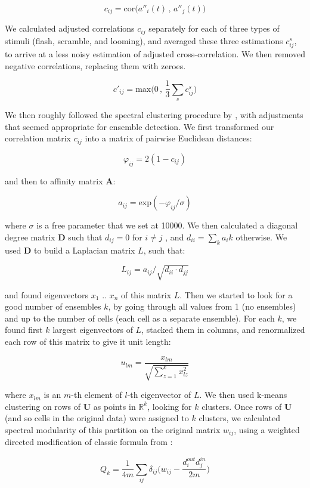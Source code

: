 \documentclass{article}
\begin{document}
\[ c_{ij} = \text{cor}\big(a''_i(t)\, , \, a''_j(t)\big) \]

We calculated adjusted correlations $c_{ij}$ separately for each of three types of stimuli (flash, scramble, and looming), and averaged these three estimations $c_{ij}^s$, to arrive at a less noisy estimation of adjusted cross-correlation. We then removed negative correlations, replacing them with zeroes.

\[ c'_{ij} = \text{max}\big(0 \, , \, \frac{1}{3} \sum_{s}{c_{ij}^s}\big) \]

We then roughly followed the spectral clustering procedure by \citep{ng2002spectral}, with adjustments that seemed appropriate for ensemble detection. We first transformed our correlation matrix $c_{ij}$ into a matrix of pairwise Euclidean distances:

\[ \varphi_{ij} = 2(1-c_{ij}) \]

and then to affinity matrix $\textbf{A}$:

\[ a_{ij} = \text{exp}(-\varphi_{ij}/\sigma) \]

where $\sigma$ is a free parameter that we set at 10000. We then calculated a diagonal degree matrix $\textbf{D}$ such that $d_{ij} = 0$ for $i \neq j$ , and $d_{ii} = \sum_k{a_ik}$ otherwise. We used $\textbf{D}$ to build a Laplacian matrix $L$, such that:

\[ L_{ij} = a_{ij}/\sqrt{d_{ii}\cdot d_{jj}} \]

and found eigenvectors $x_1$ .. $x_n$ of this matrix $L$. Then we started to look for a good number of ensembles $k$, by going through all values from 1 (no ensembles) and up to the number of cells (each cell as a separate ensemble). For each $k$, we found first $k$ largest eigenvectors of $L$, stacked them in columns, and renormalized each row of this matrix to give it unit length:

\[ u_{lm} = \frac{x_{lm}}{\sqrt{\sum_{z=1}^{k}{x_{lz}^2}}} \]

where $x_{lm}$ is an $m$-th element of $l$-th eigenvector of $L$. We then used k-means clustering on rows of $\textbf{U}$ as points in $\mathbb{R}^k$, looking for $k$ clusters. Once rows of $\textbf{U}$ (and so cells in the original data) were assigned to $k$ clusters, we calculated spectral modularity of this partition on the original matrix $w_{ij}$, using a weighted directed modification of classic formula from \citep{newman2006modularity}:

\[ Q_k = \frac{1}{4m}\sum_{ij}{\delta_{ij}\Big(w_{ij}-\frac{d^{out}_i d^{in}_j}{2m}}\Big) \]
\end{document}
